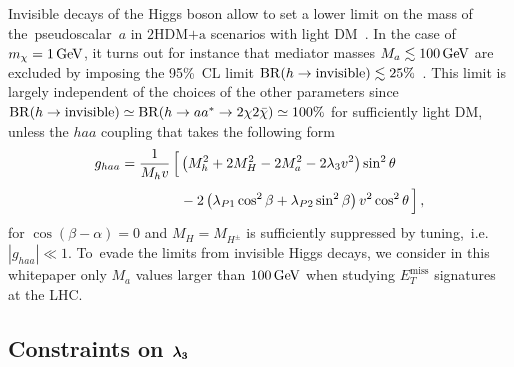 \documentclass[a4paper, 11pt,notoc]{article}
\newcommand{\MET}{\ensuremath{E_T^\mathrm{miss}}\xspace}
\newcommand{\hdma}{\ensuremath{\textrm{2HDM+a}}\xspace}
\def\bm#1{\mbox{\boldmath$#1$\unboldmath}}
\begin{document}
Invisible decays of the Higgs boson allow to set a lower limit on the mass of  the~pseudoscalar~$a$ in \hdma scenarios with light DM~\cite{Bauer:2017ota}. In the case of $m_\chi = 1 \, {\rm GeV}$, it turns out for instance that mediator masses $M_a \lesssim 100 \, {\rm GeV}$ are excluded by imposing the 95\%~CL limit ${\rm BR} (h \to  \text{invisible}) \lesssim 25\%$~\cite{Aad:2015pla,Khachatryan:2016whc}.  This limit is largely independent of the choices of the other parameters since ${\rm BR} (h \to  \text{invisible}) \simeq {\rm BR} (h \to a a^\ast \to 2 \chi 2 \bar \chi) \simeq 100\%$ for sufficiently light DM, unless  the $haa$ coupling that   takes the following form~\cite{Bauer:2017ota}
\begin{equation}
\begin{split}
g_{haa} & = \frac{1}{M_h v}  \, \Big [ \left ( M_h^2  + 2 M_H^2  -  2 M_a^2 - 2 \lambda_3 v^2 \right) \sin^2 \theta \\[1mm] &  \hspace{1.5cm} - 2 \left (  \lambda_{P1} \cos^2 \beta + \lambda_{P2} \sin^2 \beta  \right ) v^2 \cos^2 \theta \, \Big ]  \,, 
\end{split}
\end{equation}
for $\cos (\beta-\alpha) = 0$ and $M_H = M_{H^\pm}$ is sufficiently suppressed by tuning,~i.e.~$|g_{haa}| \ll 1$. To~evade the limits from invisible Higgs decays, we consider in this whitepaper only $M_a$ values larger than $100 \, {\rm GeV}$ when studying $\MET$ signatures at the LHC. 

\subsection*{Constraints on $\bm{\lambda_3}$}
\end{document}
